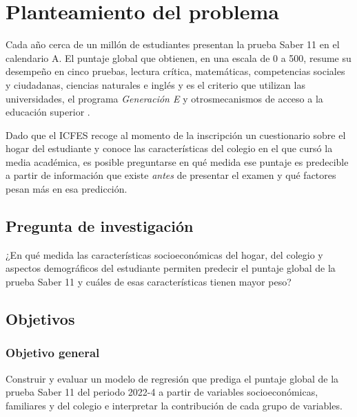 \section{Planteamiento del problema}
    Cada año cerca de un millón de estudiantes presentan la prueba Saber 11 en
    el calendario A. El puntaje global que obtienen, en una escala de 0 a 500,
    resume su desempeño en cinco pruebas, lectura crítica, matemáticas,
    competencias sociales y ciudadanas, ciencias naturales e inglés y es el 
    criterio que utilizan las universidades, el programa \textit{Generación E} 
    y otrosmecanismos de acceso a la educación superior \cite{icfes2022guia}.

    \vspace{10pt}
    
    Dado que el ICFES recoge al momento de la inscripción un cuestionario sobre 
    el hogar del estudiante y conoce las características del colegio en el que 
    cursó la media académica, es posible preguntarse en qué medida ese puntaje 
    es predecible a partir de información que existe \textit{antes} de presentar 
    el examen y qué factores pesan más en esa predicción.

    \subsection{Pregunta de investigación}
        ¿En qué medida las características socioeconómicas del hogar, del colegio 
        y aspectos demográficos del estudiante permiten predecir el puntaje global 
        de la prueba Saber 11 y cuáles de esas características tienen mayor peso?

    \subsection{Objetivos}
        \subsubsection{Objetivo general}
            Construir y evaluar un modelo de regresión que prediga el puntaje
            global de la prueba Saber 11 del periodo 2022-4 a partir de variables
            socioeconómicas, familiares y del colegio e interpretar la
            contribución de cada grupo de variables.

            \vspace{10pt}

